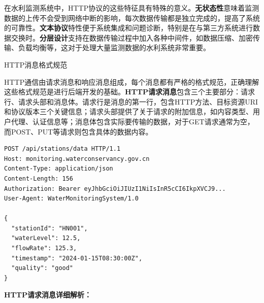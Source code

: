 在水利监测系统中，HTTP协议的这些特征具有特殊的意义。\textbf{无状态性}意味着监测数据的上传不会受到网络中断的影响，每次数据传输都是独立完成的，提高了系统的可靠性。\textbf{文本协议}特性便于系统集成和问题诊断，特别是在与第三方系统进行数据交换时。\textbf{分层设计}支持在数据传输过程中加入各种中间件，如数据压缩、加密传输、负载均衡等，这对于处理大量监测数据的水利系统非常重要。

 HTTP消息格式规范

HTTP通信由请求消息和响应消息组成，每个消息都有严格的格式规范，正确理解这些格式规范是进行后端开发的基础。\textbf{HTTP请求消息}包含三个主要部分：请求行、请求头部和消息体。请求行是消息的第一行，包含HTTP方法、目标资源URI和协议版本三个关键信息；请求头部提供了关于请求的附加信息，如内容类型、用户代理、认证信息等；消息体包含实际要传输的数据，对于GET请求通常为空，而POST、PUT等请求则包含具体的数据内容。

\begin{lstlisting}[language=Http]
POST /api/stations/data HTTP/1.1
Host: monitoring.waterconservancy.gov.cn
Content-Type: application/json
Content-Length: 156
Authorization: Bearer eyJhbGciOiJIUzI1NiIsInR5cCI6IkpXVCJ9...
User-Agent: WaterMonitoringSystem/1.0

{
  "stationId": "HN001",
  "waterLevel": 12.5,
  "flowRate": 125.3,
  "timestamp": "2024-01-15T08:30:00Z",
  "quality": "good"
}
\end{lstlisting}

\textbf{HTTP请求消息详细解析：}

